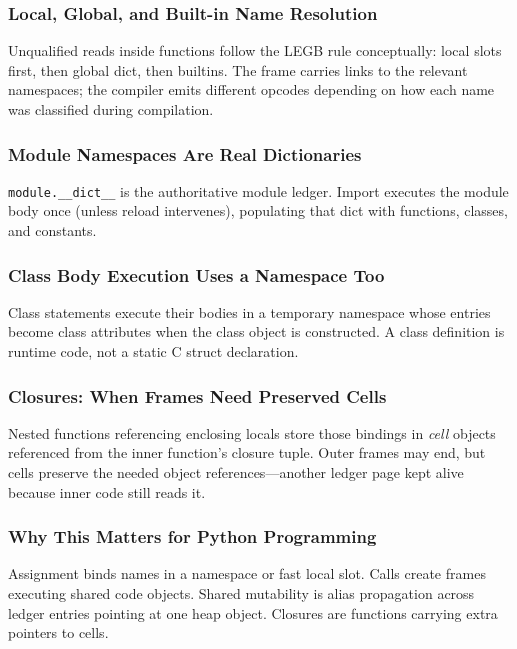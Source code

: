 \subsubsection{Local, Global, and Built-in Name Resolution}

Unqualified reads inside functions follow the LEGB rule conceptually: local slots first, then global dict, then builtins. The frame carries links to the relevant namespaces; the compiler emits different opcodes depending on how each name was classified during compilation.

\subsubsection{Module Namespaces Are Real Dictionaries}

\texttt{module.\_\_dict\_\_} is the authoritative module ledger. Import executes the module body once (unless reload intervenes), populating that dict with functions, classes, and constants.

\subsubsection{Class Body Execution Uses a Namespace Too}

Class statements execute their bodies in a temporary namespace whose entries become class attributes when the class object is constructed. A class definition is runtime code, not a static C struct declaration.

\subsubsection{Closures: When Frames Need Preserved Cells}

Nested functions referencing enclosing locals store those bindings in \emph{cell} objects referenced from the inner function's closure tuple. Outer frames may end, but cells preserve the needed object references---another ledger page kept alive because inner code still reads it.

\subsubsection{Why This Matters for Python Programming}

Assignment binds names in a namespace or fast local slot. Calls create frames executing shared code objects. Shared mutability is alias propagation across ledger entries pointing at one heap object. Closures are functions carrying extra pointers to cells.

